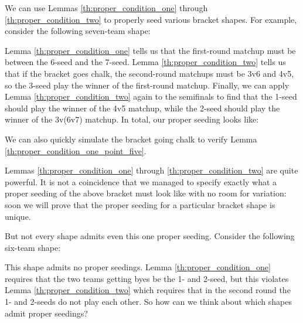 {We can use Lemmas \ref{th:proper_condition_one} through \ref{th:proper_condition_two} to properly seed various bracket shapes. For example, consider the following seven-team shape:


Lemma \ref{th:proper_condition_one} tells us that the first-round matchup must be between the 6-seed and the 7-seed. Lemma \ref{th:proper_condition_two} tells us that if the bracket goes chalk, the second-round matchups must be 3v6 and 4v5, so the 3-seed play the winner of the first-round matchup. Finally, we can apply Lemma \ref{th:proper_condition_two} again to the semifinals to find that the 1-seed should play the winner of the 4v5 matchup, while the 2-seed should play the winner of the 3v(6v7) matchup. In total, our proper seeding looks like:


We can also quickly simulate the bracket going chalk to verify Lemma \ref{th:proper_condition_one_point_five}.

Lemmas \ref{th:proper_condition_one} through \ref{th:proper_condition_two} are quite powerful. It is not a coincidence that we managed to specify exactly what a proper seeding of the above bracket must look like with no room for variation: soon we will prove that the proper seeding for a particular bracket shape is unique. 

But not every shape admits even this one proper seeding. Consider the following six-team shape:


This shape admits no proper seedings. Lemma \ref{th:proper_condition_one} requires that the two teams getting byes be the 1- and 2-seed, but this violates Lemma \ref{th:proper_condition_two} which requires that in the second round the 1- and 2-seeds do not play each other. So how can we think about which shapes admit proper seedings?

}
